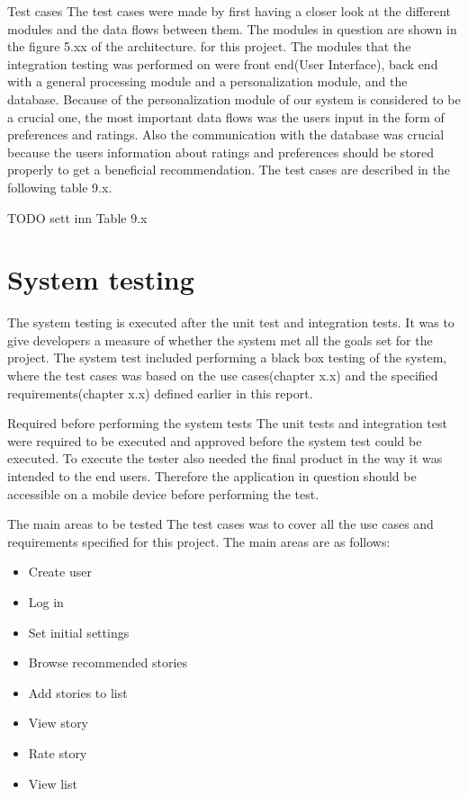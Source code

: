 Test cases\newline 
The test cases were made by first having a closer look at the different modules and the data flows between them. The modules in question are shown in the figure 5.xx of the architecture. for this project. The modules that the integration testing was performed on were front end(User Interface), back end with a general processing module and a personalization module, and the database. Because of the personalization module of our system is considered to be a crucial one, the most important data flows was the users input in the form of preferences and ratings. Also the communication with the database was crucial because the users information about ratings and preferences should be stored properly to get a beneficial recommendation. The test cases are described in the following table 9.x.

TODO sett inn Table 9.x 

\section{System testing}

The system testing is executed after the unit test and integration tests. It was to give developers a measure of whether the system met all the goals set for the project.  The system test included performing a black box testing of the system, where the test cases was based on the use cases(chapter x.x) and the specified requirements(chapter x.x)  defined earlier in this report. \newline

Required before performing the system tests\newline
The unit tests and integration test were required to be executed and approved before the system test could be executed. To execute the tester also needed the final product in the way it was intended to the end users. Therefore the application in question should be accessible on a mobile device before performing the test. \newline

The main areas to be tested\newline
The test cases was to cover all the use cases and requirements specified for this project. The main areas are as follows:
\begin{itemize}
	\item Create user
	\item Log in
	\item Set initial settings
	\item Browse recommended stories
	\item Add stories to list
	\item View story
	\item Rate story 
	\item View list \newline
\end{itemize}

